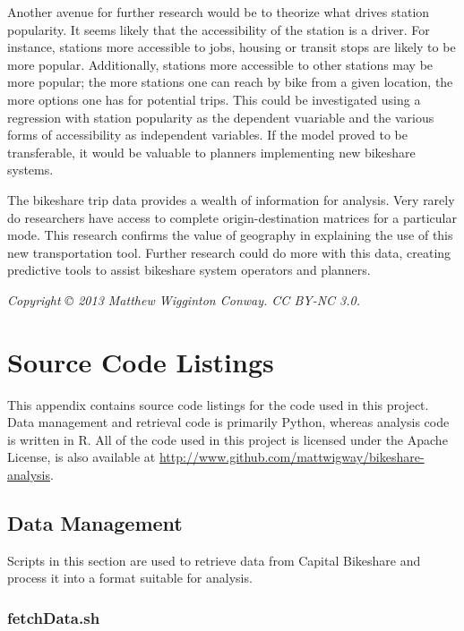 \documentclass[letterpaper,11pt]{article}
\begin{document}
Another avenue for further research would be to theorize what drives
station popularity. It seems likely that the accessibility of the
station is a driver. For instance, stations more accessible to jobs,
housing or transit stops are likely to be more popular. Additionally,
stations more accessible to other stations may be more popular; the
more stations one can reach by bike from a given location, the more
options one has for potential trips. This could be investigated using
a regression with station popularity as the dependent vuariable and the
various forms of accessibility as independent variables. If the model
proved to be transferable, it would be valuable to planners
implementing new bikeshare systems.

The bikeshare trip data provides a wealth of information for
analysis. Very rarely do researchers have access to complete
origin-destination matrices for a particular mode. This research
confirms the value of geography in explaining the use of this new
transportation tool. Further research could do more with this data,
creating predictive tools to assist bikeshare system operators and
planners.

\clearpage\newpage
\printbibliography

\vspace{25em}

\emph{Copyright © 2013 Matthew Wigginton Conway. CC BY-NC 3.0.}

\newpage
{}
\fancyhfoffset[E,O]{0pt}
\appendix
\section{Source Code Listings}

This appendix contains source code listings for the code used in this
project. Data management and retrieval code is primarily Python,
whereas analysis code is written in R. All of the code used in this
project is licensed under the Apache License, is also available at
\url{http://www.github.com/mattwigway/bikeshare-analysis}.

\subsection{Data Management}

Scripts in this section are used to retrieve data from Capital
Bikeshare and process it into a format suitable for analysis.

\subsubsection{fetchData.sh}
\label{fetchData.sh}
\end{document}
